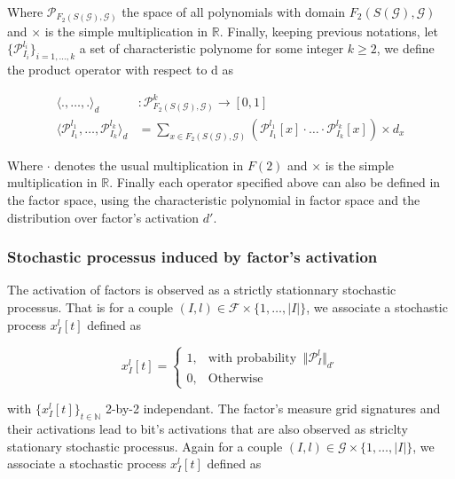 \documentclass[a4paper, 11pt]{article}
\begin{document}
Where $\mathcal{P}_{F_2(S(\mathcal{G}), \mathcal{G})}$ the space of all polynomials with domain $F_2(S(\mathcal{G}), \mathcal{G})$ and $\times$ is the simple multiplication in $\mathbb{R}$. Finally, keeping previous notations, let $\lbrace \mathcal{P}_{I_{i}}^{l_i} \rbrace_{i=1, ..., k}$ a set of characteristic polynome for some integer $k \geq 2$, we define the product operator with respect to d as 

\begin{align*}
\langle ., \ldots, . \rangle_{d} &: \mathcal{P}_{F_2(S(\mathcal{G}), \mathcal{G})}^{k} \rightarrow \left[ 0, 1\right] \\
\langle \mathcal{P}^{l_1}_{I_1}, \ldots,  \mathcal{P}^{l_k}_{I_k} \rangle_{d} &= \sum_{x \in F_2(S(\mathcal{G}), \mathcal{G})} \left( \mathcal{P}^{l_1}_{I_1} \left[ x \right] \cdot \ldots \cdot \mathcal{P}^{l_k}_{I_k} \left[ x \right] \right) \times d_x
\end{align*}

Where $\cdot$ denotes the usual multiplication in $F(2)$ and $\times$ is the simple multiplication in $\mathbb{R}$. Finally each operator specified above can also be defined in the factor space, using the characteristic polynomial in factor space and the distribution over factor's activation $d'$.


\subsubsection*{Stochastic processus induced by factor's activation}

The activation of factors is observed as a strictly stationnary stochastic processus. That is for a couple $(I, l) \in \mathcal{F} \times \{1, \ldots, \vert I \vert\}$,  we associate a stochastic process $x_I^l[t]$ defined as 


\begin{equation*}
x_I^l[t] = \begin{cases} 1, & \text{with probability }\ \Vert \mathcal{P}_I^l \Vert_{d'}\\ 0, & \text{Otherwise} \end{cases}
\end{equation*}

with $\{ x_I^l[t] \}_{t\in \mathbb{N}}$ 2-by-2 independant. The factor's measure grid signatures and their activations lead to bit's activations that are also observed as striclty stationary stochastic processus. Again for a couple $(I, l) \in \mathcal{G} \times \{1, \ldots, \vert I \vert\}$,  we associate a stochastic process $x_I^l[t]$ defined as 
\end{document}
